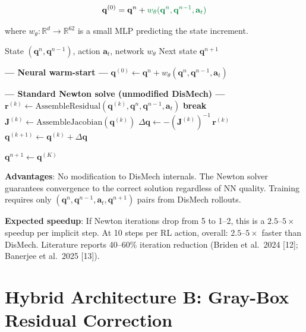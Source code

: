 \documentclass[11pt]{article}
\newcommand{\vect}[1]{\mathbf{#1}}
\newcommand{\mat}[1]{\mathbf{#1}}
\newcommand{\Real}{\mathbb{R}}
\newcommand{\nn}[1]{{\color{nngreen}#1}}
\begin{document}
\begin{equation}
  \vect{q}^{(0)} = \vect{q}^n + \nn{w_\theta(\vect{q}^n, \vect{q}^{n-1}, \vect{a}_t)}
  \label{eq:warmstart}
\end{equation}

\noindent
where $w_\theta\colon \Real^{d} \to \Real^{62}$ is a small MLP predicting the state increment.

\begin{algorithm}[H]
\caption{Warm-Started Implicit Euler Step}
\label{alg:warmstart}
\begin{algorithmic}[1]
\Require State $(\vect{q}^n, \vect{q}^{n-1})$, action $\vect{a}_t$, network $w_\theta$
\Ensure Next state $\vect{q}^{n+1}$

\Statex \textcolor{nngreen}{\textbf{--- Neural warm-start ---}}
\State $\vect{q}^{(0)} \gets \vect{q}^n + w_\theta(\vect{q}^n, \vect{q}^{n-1}, \vect{a}_t)$ 

\Statex
\Statex \textcolor{physicsblue}{\textbf{--- Standard Newton solve (unmodified DisMech) ---}}
  \State $\vect{r}^{(k)} \gets \text{AssembleResidual}(\vect{q}^{(k)}, \vect{q}^n, \vect{q}^{n-1}, \vect{a}_t)$
  \If{$\|\vect{r}^{(k)}\| < \epsilon$}
    \State \textbf{break} 
  \EndIf
  \State $\mat{J}^{(k)} \gets \text{AssembleJacobian}(\vect{q}^{(k)})$
  \State $\Delta\vect{q} \gets -(\mat{J}^{(k)})^{-1}\,\vect{r}^{(k)}$ 
  \State $\vect{q}^{(k+1)} \gets \vect{q}^{(k)} + \Delta\vect{q}$
\EndFor

\State \Return $\vect{q}^{n+1} \gets \vect{q}^{(K)}$
\end{algorithmic}
\end{algorithm}

\noindent
\textbf{Advantages}: No modification to DisMech internals.  The Newton solver guarantees convergence to the correct solution regardless of NN quality.  Training requires only $(\vect{q}^n, \vect{q}^{n-1}, \vect{a}_t, \vect{q}^{n+1})$ pairs from DisMech rollouts.

\textbf{Expected speedup}: If Newton iterations drop from 5 to 1--2, this is a $2.5$--$5\times$ speedup per implicit step.  At 10 steps per RL action, overall: $2.5$--$5\times$ faster than DisMech.
Literature reports 40--60\% iteration reduction (Briden et al.\ 2024 [12]; Banerjee et al.\ 2025 [13]).


\section{Hybrid Architecture B: Gray-Box Residual Correction}
\label{sec:residual-newton}
\end{document}
